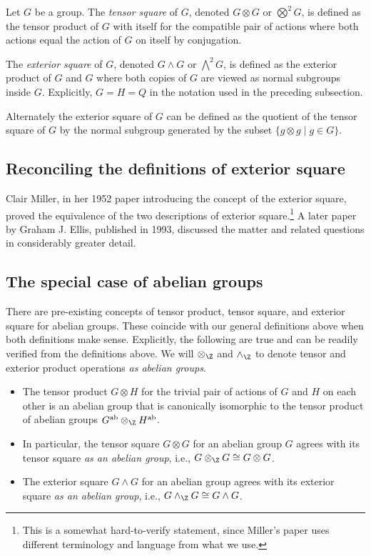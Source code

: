 \documentclass{ucetd}
\begin{document}
Let $G$ be a group. The {\em tensor square} of $G$, denoted $G \otimes
G$ or $\bigotimes^2G$, is defined as the tensor product of $G$ with
itself for the compatible pair of actions where both actions equal the
action of $G$ on itself by conjugation.

The {\em exterior square} of $G$, denoted $G \wedge G$ or
$\bigwedge^2G$, is defined as the exterior product of $G$ and $G$
where both copies of $G$ are viewed as normal subgroups inside
$G$. Explicitly, $G = H = Q$ in the notation used in the preceding
subsection.

Alternately the exterior square of $G$ can be defined as the quotient
of the tensor square of $G$ by the normal subgroup generated by the
subset $\{ g \otimes g \mid g \in G \}$.

\subsection{Reconciling the definitions of exterior square}\label{sec:exteriorsquare-reconciliation}

Clair Miller, in her 1952 paper \cite{Miller52} introducing the
concept of the exterior square, proved the equivalence of the two
descriptions of exterior square.\footnote{This is a somewhat
  hard-to-verify statement, since Miller's paper uses different
  terminology and language from what we use.} A later paper
\cite{Ellis93} by Graham J. Ellis, published in 1993, discussed the
matter and related questions in considerably greater detail.

\subsection{The special case of abelian groups}\label{sec:exterior-tensor-abelian-reconciliation}

There are pre-existing concepts of tensor product, tensor square, and
exterior square for abelian groups. These coincide with our general
definitions above when both definitions make sense. Explicitly, the
following are true and can be readily verified from the definitions
above. We will $\otimes_\Z$ and $\wedge_\Z$ to denote tensor and
exterior product operations {\em as abelian groups}.

\begin{itemize}
\item The tensor product $G \otimes H$ for the trivial pair of actions
  of $G$ and $H$ on each other is an abelian group that is canonically
  isomorphic to the tensor product of abelian groups
  $G^{\operatorname{ab}} \otimes_\Z H^{\operatorname{ab}}$.
\item In particular, the tensor square $G \otimes G$ for an abelian
  group $G$ agrees with its tensor square {\em as an abelian group},
  i.e., $G \otimes_\Z G \cong G \otimes G$.
\item The exterior square $G \wedge G$ for an abelian group agrees
  with its exterior square {\em as an abelian group}, i.e., $G
  \wedge_\Z G \cong G \wedge G$.
\end{itemize}
\end{document}
